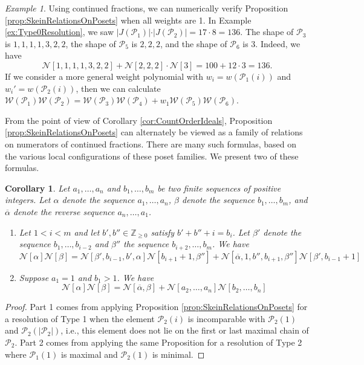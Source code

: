 \documentclass[12pt, letterpaper,table]{amsart}
\newtheorem{cor}[theorem]{Corollary}
\theoremstyle{remark}
\newtheorem{example}[theorem]{Example}
\newcommand{\calP}{\mathcal{P}}
\begin{document}
\begin{example}
Using continued fractions, we can numerically verify Proposition \ref{prop:SkeinRelationsOnPosets} when all weights are 1. In Example \ref{ex:Type0Resolution}, we saw $\vert J(\calP_1) \vert \cdot \vert J(\calP_2 ) \vert = 17 \cdot 8 = 136$. The shape of $\calP_3$ is $1,1,1,1,3,2,2$, the shape of $\calP_5$ is $2,2,2$, and the shape of $\calP_6$ is 3. Indeed, we have \[
\mathcal{N}[1,1,1,1,3,2,2] + \mathcal{N}[2,2,2] \cdot \mathcal{N}[3] = 100 + 12 \cdot 3 = 136.
\]
If we consider a more general weight polynomial with $w_i = w(\calP_1(i))$ and $w_i' = w(\calP_2(i))$, then we can calculate $\mathcal{W}(\calP_1) \mathcal{W}(\calP_2) = \mathcal{W}(\calP_3) \mathcal{W}(\calP_4) + w_1 \mathcal{W}(\calP_5) \mathcal{W}(\calP_6)$.
\end{example}


From the point of view of Corollary \ref{cor:CountOrderIdeals}, Proposition \ref{prop:SkeinRelationsOnPosets} can alternately be viewed as a family of relations on numerators of continued fractions. There are many such formulas, based on the various local configurations of these poset families. We present two of these formulas.

\begin{cor}
Let $a_1,\ldots,a_n$ and $b_1,\ldots,b_m$ be two finite sequences of positive integers.  Let $\alpha$ denote the sequence $a_1,\ldots,a_n$, $\beta$ denote the sequence $b_1,\ldots,b_m$, and $\overline{\alpha}$ denote the reverse sequence $a_n,\ldots,a_1$.

\begin{enumerate}
    \item Let $1 < i < m$ and let $b',b'' \in \mathbb{Z}_{\geq 0}$ satisfy $b' + b'' + i = b_i$. Let $\beta'$ denote the sequence $b_1,\ldots,b_{i-2}$ and $\beta''$ the sequence $b_{i+2},\ldots,b_m$. We have \[
\mathcal{N}[\alpha] \mathcal{N}[\beta] = \mathcal{N}[\beta',b_{i-1},b',\alpha]\mathcal{N}[b_{i+1}+1,\beta''] + \mathcal{N}[\overline{\alpha},1,b'',b_{i+1},\beta''] \mathcal{N}[\beta',b_{i-1}+1]
    \]
    \item Suppose $a_1 = 1$ and $b_1 > 1$. We have \[
\mathcal{N}[\alpha]\mathcal{N}[\beta] = \mathcal{N}[\overline{\alpha},\beta] + \mathcal{N}[a_2,\ldots,a_n]\mathcal{N}[b_2,\ldots,b_n]
    \]
\end{enumerate}
\end{cor}

\begin{proof}
Part 1 comes from applying Proposition \ref{prop:SkeinRelationsOnPosets} for a resolution of Type 1 when the element $\calP_2(i)$ is incomparable with $\calP_2(1)$ and $\calP_2(\vert \calP_2 \vert)$, i.e., this element does not lie on the first or last maximal chain of $\calP_2$. Part 2 comes from applying the same Proposition for a resolution of Type 2 where $\calP_1(1)$ is maximal and $\calP_2(1)$ is minimal.
\end{proof}
\end{document}
